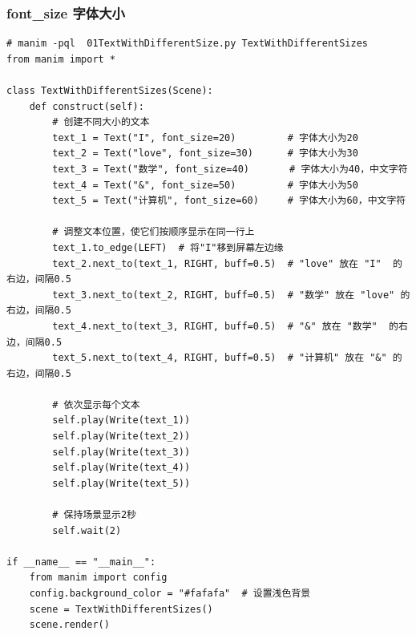 \subsubsection{font\_size 字体大小}
\label{subsubsec:manim_text_formula_style_font_fontsize}
\begin{lstlisting}[style=pythonstyle]
# manim -pql  01TextWithDifferentSize.py TextWithDifferentSizes
from manim import *

class TextWithDifferentSizes(Scene):
    def construct(self):
        # 创建不同大小的文本
        text_1 = Text("I", font_size=20)         # 字体大小为20
        text_2 = Text("love", font_size=30)      # 字体大小为30
        text_3 = Text("数学", font_size=40)       # 字体大小为40，中文字符
        text_4 = Text("&", font_size=50)         # 字体大小为50
        text_5 = Text("计算机", font_size=60)     # 字体大小为60，中文字符

        # 调整文本位置，使它们按顺序显示在同一行上
        text_1.to_edge(LEFT)  # 将"I"移到屏幕左边缘
        text_2.next_to(text_1, RIGHT, buff=0.5)  # "love" 放在 "I"  的右边，间隔0.5
        text_3.next_to(text_2, RIGHT, buff=0.5)  # "数学" 放在 "love" 的右边，间隔0.5
        text_4.next_to(text_3, RIGHT, buff=0.5)  # "&" 放在 "数学"  的右边，间隔0.5
        text_5.next_to(text_4, RIGHT, buff=0.5)  # "计算机" 放在 "&" 的右边，间隔0.5

        # 依次显示每个文本
        self.play(Write(text_1))
        self.play(Write(text_2))
        self.play(Write(text_3))
        self.play(Write(text_4))
        self.play(Write(text_5))

        # 保持场景显示2秒
        self.wait(2)

if __name__ == "__main__":
    from manim import config
    config.background_color = "#fafafa"  # 设置浅色背景
    scene = TextWithDifferentSizes()
    scene.render()
\end{lstlisting}    

